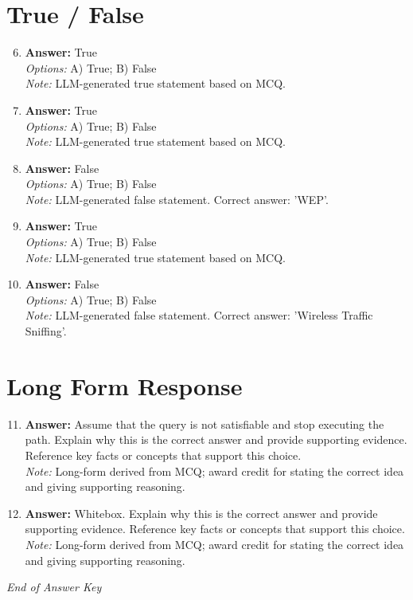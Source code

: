 \documentclass[12pt]{article}
\begin{document}
\section*{True / False}
\begin{enumerate}[label=\arabic*.]
\setcounter{enumi}{5}
\item \textbf{Answer:} True
\\ \textit{Options:} A) True; B) False
\\ \textit{Note:} LLM-generated true statement based on MCQ.
\item \textbf{Answer:} True
\\ \textit{Options:} A) True; B) False
\\ \textit{Note:} LLM-generated true statement based on MCQ.
\item \textbf{Answer:} False
\\ \textit{Options:} A) True; B) False
\\ \textit{Note:} LLM-generated false statement. Correct answer: 'WEP'.
\item \textbf{Answer:} True
\\ \textit{Options:} A) True; B) False
\\ \textit{Note:} LLM-generated true statement based on MCQ.
\item \textbf{Answer:} False
\\ \textit{Options:} A) True; B) False
\\ \textit{Note:} LLM-generated false statement. Correct answer: 'Wireless Traffic Sniffing'.
\end{enumerate}

\section*{Long Form Response}
\begin{enumerate}[label=\arabic*.]
\setcounter{enumi}{10}
\item \textbf{Answer:} Assume that the query is not satisfiable and stop executing the path. Explain why this is the correct answer and provide supporting evidence. Reference key facts or concepts that support this choice.
\\ \textit{Note:} Long-form derived from MCQ; award credit for stating the correct idea and giving supporting reasoning.
\item \textbf{Answer:} Whitebox. Explain why this is the correct answer and provide supporting evidence. Reference key facts or concepts that support this choice.
\\ \textit{Note:} Long-form derived from MCQ; award credit for stating the correct idea and giving supporting reasoning.
\end{enumerate}

\vfill
\noindent\textit{End of Answer Key}
\end{document}
